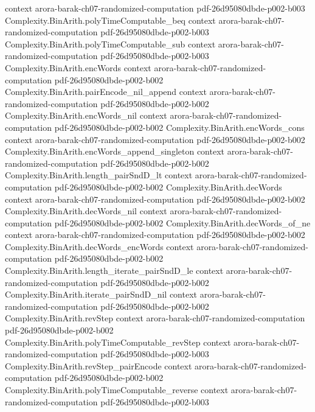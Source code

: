 \begin{theorem}
  {context}
  {arora-barak-ch07-randomized-computation}
  {pdf-26d95080dbde-p002-b003}
\proofstep
  {Complexity.BinArith.polyTimeComputable_beq}
  {context}
  {arora-barak-ch07-randomized-computation}
  {pdf-26d95080dbde-p002-b003}
\proofstep
  {Complexity.BinArith.polyTimeComputable_sub}
  {context}
  {arora-barak-ch07-randomized-computation}
  {pdf-26d95080dbde-p002-b003}
\proofstep
  {Complexity.BinArith.encWords}
  {context}
  {arora-barak-ch07-randomized-computation}
  {pdf-26d95080dbde-p002-b002}
\proofstep
  {Complexity.BinArith.pairEncode_nil_append}
  {context}
  {arora-barak-ch07-randomized-computation}
  {pdf-26d95080dbde-p002-b002}
\proofstep
  {Complexity.BinArith.encWords_nil}
  {context}
  {arora-barak-ch07-randomized-computation}
  {pdf-26d95080dbde-p002-b002}
\proofstep
  {Complexity.BinArith.encWords_cons}
  {context}
  {arora-barak-ch07-randomized-computation}
  {pdf-26d95080dbde-p002-b002}
\proofstep
  {Complexity.BinArith.encWords_append_singleton}
  {context}
  {arora-barak-ch07-randomized-computation}
  {pdf-26d95080dbde-p002-b002}
\proofstep
  {Complexity.BinArith.length_pairSndD_lt}
  {context}
  {arora-barak-ch07-randomized-computation}
  {pdf-26d95080dbde-p002-b002}
\proofstep
  {Complexity.BinArith.decWords}
  {context}
  {arora-barak-ch07-randomized-computation}
  {pdf-26d95080dbde-p002-b002}
\proofstep
  {Complexity.BinArith.decWords_nil}
  {context}
  {arora-barak-ch07-randomized-computation}
  {pdf-26d95080dbde-p002-b002}
\proofstep
  {Complexity.BinArith.decWords_of_ne}
  {context}
  {arora-barak-ch07-randomized-computation}
  {pdf-26d95080dbde-p002-b002}
\proofstep
  {Complexity.BinArith.decWords_encWords}
  {context}
  {arora-barak-ch07-randomized-computation}
  {pdf-26d95080dbde-p002-b002}
\proofstep
  {Complexity.BinArith.length_iterate_pairSndD_le}
  {context}
  {arora-barak-ch07-randomized-computation}
  {pdf-26d95080dbde-p002-b002}
\proofstep
  {Complexity.BinArith.iterate_pairSndD_nil}
  {context}
  {arora-barak-ch07-randomized-computation}
  {pdf-26d95080dbde-p002-b002}
\proofstep
  {Complexity.BinArith.revStep}
  {context}
  {arora-barak-ch07-randomized-computation}
  {pdf-26d95080dbde-p002-b002}
\proofstep
  {Complexity.BinArith.polyTimeComputable_revStep}
  {context}
  {arora-barak-ch07-randomized-computation}
  {pdf-26d95080dbde-p002-b003}
\proofstep
  {Complexity.BinArith.revStep_pairEncode}
  {context}
  {arora-barak-ch07-randomized-computation}
  {pdf-26d95080dbde-p002-b002}
\proofstep
  {Complexity.BinArith.polyTimeComputable_reverse}
  {context}
  {arora-barak-ch07-randomized-computation}
  {pdf-26d95080dbde-p002-b003}

\end{theorem}
